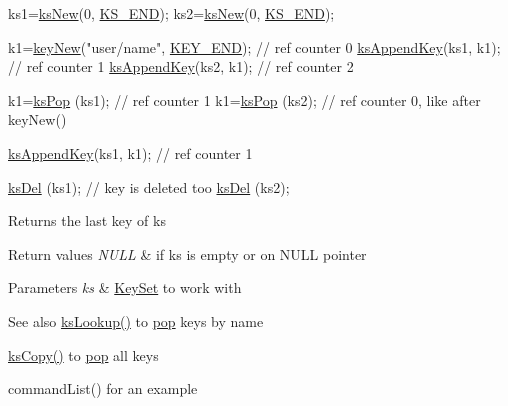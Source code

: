 \begin{DoxyCode}
ks1=\hyperlink{group__keyset_ga671e1aaee3ae9dc13b4834a4ddbd2c3c}{ksNew}(0, \hyperlink{group__keyset_ga7a28fce3773b2c873c94ac80b8b4cd54}{KS\_END});
ks2=\hyperlink{group__keyset_ga671e1aaee3ae9dc13b4834a4ddbd2c3c}{ksNew}(0, \hyperlink{group__keyset_ga7a28fce3773b2c873c94ac80b8b4cd54}{KS\_END});

k1=\hyperlink{group__key_gad23c65b44bf48d773759e1f9a4d43b89}{keyNew}(\textcolor{stringliteral}{"user/name"}, \hyperlink{group__key_gga9b703ca49f48b482def322b77d3e6bc8aa8adb6fcb92dec58fb19410eacfdd403}{KEY\_END}); \textcolor{comment}{// ref counter 0}
\hyperlink{group__keyset_gaa5a1d467a4d71041edce68ea7748ce45}{ksAppendKey}(ks1, k1); \textcolor{comment}{// ref counter 1}
\hyperlink{group__keyset_gaa5a1d467a4d71041edce68ea7748ce45}{ksAppendKey}(ks2, k1); \textcolor{comment}{// ref counter 2}

k1=\hyperlink{group__keyset_gae42530b04defb772059de0600159cf69}{ksPop} (ks1); \textcolor{comment}{// ref counter 1}
k1=\hyperlink{group__keyset_gae42530b04defb772059de0600159cf69}{ksPop} (ks2); \textcolor{comment}{// ref counter 0, like after keyNew()}

\hyperlink{group__keyset_gaa5a1d467a4d71041edce68ea7748ce45}{ksAppendKey}(ks1, k1); \textcolor{comment}{// ref counter 1}

\hyperlink{group__keyset_ga27e5c16473b02a422238c8d970db7ac8}{ksDel} (ks1); \textcolor{comment}{// key is deleted too}
\hyperlink{group__keyset_ga27e5c16473b02a422238c8d970db7ac8}{ksDel} (ks2);
\end{DoxyCode}


\begin{DoxyReturn}{Returns}
the last key of {\ttfamily ks} 
\end{DoxyReturn}

\begin{DoxyRetVals}{Return values}
{\em N\+U\+LL} & if {\ttfamily ks} is empty or on N\+U\+LL pointer \\
\hline
\end{DoxyRetVals}

\begin{DoxyParams}{Parameters}
{\em ks} & \hyperlink{classkdb_1_1KeySet}{Key\+Set} to work with \\
\hline
\end{DoxyParams}
\begin{DoxySeeAlso}{See also}
\hyperlink{group__keyset_ga60f1ddcf23272f2b29b90e92ebe9b56f}{ks\+Lookup()} to \hyperlink{classkdb_1_1KeySet_a7f207457a1c12633a1a5301a3a1bbaed}{pop} keys by name 

\hyperlink{group__keyset_gaba1f1dbea191f4d7e7eb3e4296ae7d5e}{ks\+Copy()} to \hyperlink{classkdb_1_1KeySet_a7f207457a1c12633a1a5301a3a1bbaed}{pop} all keys 

command\+List() for an example 
\end{DoxySeeAlso}
\mbox{\label{classkdb_1_1KeySet_a5bc5a16a726e959adaf3cf8506e7b849}} 
